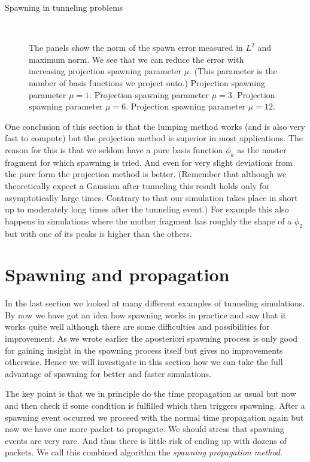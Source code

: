 \begin{chapter}{Spawning in tunneling problems}
\begin{figure}[h!]
{  } \\
  \caption[Norm of the spawn error with the projection spawning method]{
  The panels show the norm of the spawn error measured in $L^2$ and maximum norm. We see
  that we can reduce the error with increasing projection spawning parameter $\mu$. (This parameter
  is the number of basis functions we project onto.)
   Projection spawning parameter $\mu = 1$.
   Projection spawning parameter $\mu = 3$.
   Projection spawning parameter $\mu = 6$.
   Projection spawning parameter $\mu = 12$.
  \label{fig:tunnel_spawn_project_K50_spawn_error}
  }
\end{figure}


One conclusion of this section is that the lumping method works (and is also very
fast to compute) but the projection method is superior in most applications. The
reason for this is that we seldom have a pure basis function $\phi_k$ as the master
fragment for which spawning is tried. And even for very slight deviations from
the pure form the projection method is better. (Remember that although we theoretically
expect a Gaussian after tunneling this result holds only for asymptotically large
times. Contrary to that our simulation takes place in short up to moderately long times after
the tunneling event.) For example this also happens in simulations where the mother
fragment has roughly the shape of a $\phi_2$ but with one of its peaks is higher
than the others.


\FloatBarrier
\section{Spawning and propagation}
\label{sec:spawn_propag_tunnel}

In the last section we looked at many different examples of tunneling simulations.
By now we have got an idea how spawning works in practice and saw that it works
quite well although there are some difficulties and possibilities for improvement.
As we wrote earlier the aposteriori spawning process is only good for gaining insight
in the spawning process itself but gives no improvements otherwise. Hence we will investigate
in this section how we can take the full advantage of spawning for better and faster
simulations.

The key point is that we in principle do the time propagation as usual but now and
then check if some condition is fulfilled which then triggers spawning. After
a spawning event occurred we proceed with the normal time propagation again but
now we have one more packet to propagate. We should stress that spawning events
are very rare. And thus there is little risk of ending up with dozens of packets.
We call this combined algorithm the \emph{spawning propagation method}.


\end{chapter}
